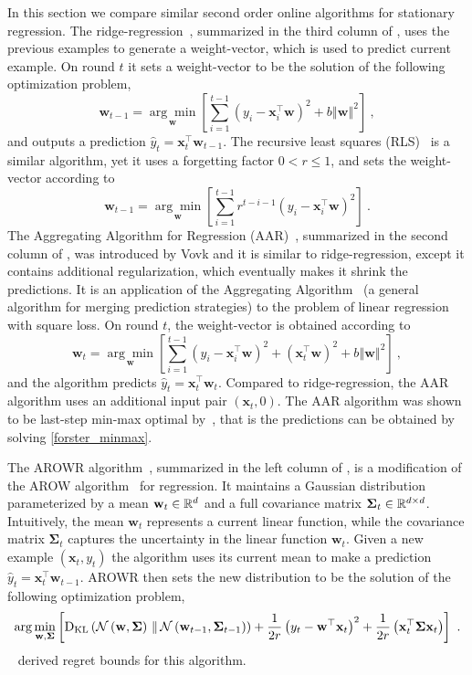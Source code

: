 In this section we compare similar second order online algorithms for stationary regression. The ridge-regression~\citep{Foster91}, summarized in the third column of , uses the previous examples to generate a weight-vector, which is used to predict current example. On round $t$ it sets a weight-vector to be the solution of the following optimization problem,
\[
\mathbf{w}_{t-1}=\underset{\mathbf{w}}{\arg\min}\left[\sum_{i=1}^{t-1}\left(y_{i}-\mathbf{x}_{i}^{\top}\mathbf{w}\right)^{2}+b\left\Vert \mathbf{w}\right\Vert ^{2}\right]~,
\]
and outputs a prediction $\hat{y}_{t}=\mathbf{x}_{t}^{\top}\mathbf{w}_{t-1}$.
The recursive least squares (RLS)~\citep{Hayes} is a similar algorithm, yet it uses a forgetting factor $0<r \leq 1$, and sets the weight-vector according to
\[
\mathbf{w}_{t-1}=\underset{\mathbf{w}}{\arg\min}\left[\sum_{i=1}^{t-1}r^{t-i-1}\left(y_{i}-\mathbf{x}_{i}^{\top}\mathbf{w}\right)^{2}\right]~.
\]
The Aggregating Algorithm for Regression (AAR)~\citep{Vovk97,Vovk01},
summarized in the second column of , was
introduced by Vovk and it is similar to ridge-regression, except it
contains additional regularization, which eventually makes it shrink
the predictions. It is an application of the Aggregating Algorithm~\citep{vovkAS} (a general algorithm for merging prediction strategies) to the problem of linear regression with square loss. On round $t$, the weight-vector is obtained according to
\[
\mathbf{w}_{t}=\underset{\mathbf{w}}{\arg\min}\left[\sum_{i=1}^{t-1}\left(y_{i}-\mathbf{x}_{i}^{\top}\mathbf{w}\right)^{2}+\left(\mathbf{x}_{t}^{\top}\mathbf{w}\right)^{2}+b\left\Vert \mathbf{w}\right\Vert ^{2}\right]~,
\]
and the algorithm predicts $\hat{y}_{t}=\mathbf{x}_{t}^{\top}\mathbf{w}_{t}$. Compared to ridge-regression, the AAR algorithm uses an additional input pair $(\mathbf{x}_t,0)$. The AAR algorithm was shown to be last-step min-max optimal by~\cite{Forster}, that is the predictions can be obtained by solving \eqref{forster_minmax}.

The AROWR algorithm~\citep{VaitsCr11,CrammerKuDr12}, summarized in the left column of , is a modification of the
AROW algorithm~\citep{CrammerKuDr09} for regression. It maintains a Gaussian distribution parameterized by a
mean $\mathbf{w}_t\in\mathbb{R}^d$ and a full covariance matrix
$\mathbf{\Sigma}_t\in\mathbb{R}^{d \times d}$. Intuitively, the mean $\mathbf{w}_t$
represents a current linear function, while the covariance matrix
$\mathbf{\Sigma}_t$ captures the uncertainty in the linear function
$\mathbf{w}_t$. Given a new example $(\mathbf{x}_t,y_t)$ the algorithm uses its
current mean to make a prediction $\hat{y}_{t}=\mathbf{x}_{t}^{\top}\mathbf{w}_{t-1}$.
AROWR then sets the new distribution to be the solution of the
following optimization problem,
\begin{align*}
 \arg\min_{\mathbf{w}, \mathbf{\Sigma}} \left[ {\textrm{D}_{\textrm{KL}}}\left({ {\mathcal{N}}\left({\mathbf{w}, \mathbf{\Sigma}}\right) \,\Vert\,
    {\mathcal{N}}\left({\mathbf{w}_{t-1}, \mathbf{\Sigma}_{t-1}}\right)}\right)  + \frac{1}{2r}
  \left({y_{t} - \mathbf{w}^{\top}\mathbf{x}_{t}}\right)^2+ \frac{1}{2r} \left({{\mathbf{x}}^{\top}_{t}
    \mathbf{\Sigma} \mathbf{x}_{t}}\right) \right]~.
\end{align*}
~\cite{CrammerKuDr12} derived regret bounds for this algorithm.

